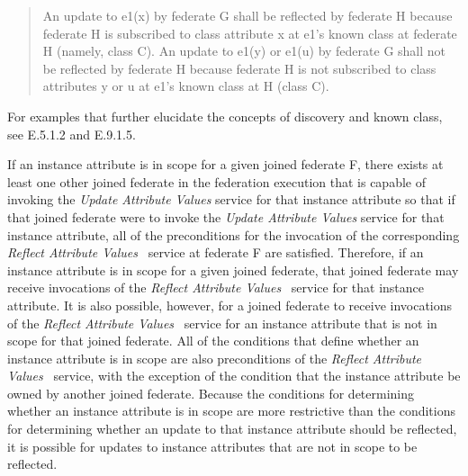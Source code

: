 \begin{annexstdpage}
    \begin{quote}
        An update to e1(x) by federate G shall be reflected by federate H because federate H is subscribed to class attribute x at e1's known class at federate H (namely, class C). An update to e1(y) or e1(u) by federate G shall not be reflected by federate H because federate H is not subscribed to class attributes y or u at e1's known class at H (class C).
    \end{quote}



    For examples that further elucidate the concepts of discovery and known class, see E.5.1.2 and E.9.1.5.

    If an instance attribute is in scope for a given joined federate F, there exists at least one other joined federate in the federation execution that is capable of invoking the \textit{Update Attribute Values} service for that instance attribute so that if that joined federate were to invoke the \textit{Update Attribute Values} service for that instance attribute, all of the preconditions for the invocation of the corresponding \textit{Reflect Attribute Values} \rtiinitiated\ service at federate F are satisfied. Therefore, if an instance attribute is in scope for a given joined federate, that joined federate may receive invocations of the \textit{Reflect Attribute Values} \rtiinitiated\ service for that instance attribute. It is also possible, however, for a joined federate to receive invocations of the \textit{Reflect Attribute Values} \rtiinitiated\ service for an instance attribute that is not in scope for that joined federate. All of the conditions that define whether an instance attribute is in scope are also preconditions of the \textit{Reflect Attribute Values} \rtiinitiated\ service, with the exception of the condition that the instance attribute be owned by another joined federate. Because the conditions for determining whether an instance attribute is in scope are more restrictive than the conditions for determining whether an update to that instance attribute should be reflected, it is possible for updates to instance attributes that are not in scope to be reflected.
\end{annexstdpage}

\clearpage

